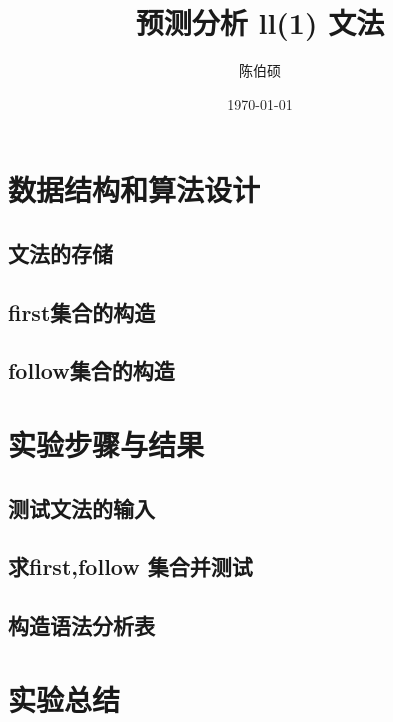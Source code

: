 \documentclass[pdfCover]{myreport} %
\title{预测分析 ll(1) 文法}
\author{陈伯硕}
\date{\today}
\begin{document}
\maketitle
\pagestyle{empty}

\setcounter{section}{3}
\section{数据结构和算法设计}
  \subsection{文法的存储}
    
  \subsection{first集合的构造}
    
  \subsection{follow集合的构造}
    


\section{实验步骤与结果}
  \subsection{测试文法的输入}
    
  \subsection{求first,follow 集合并测试}
    
  \subsection{构造语法分析表}
    


\section{实验总结}
  



\end{document}

